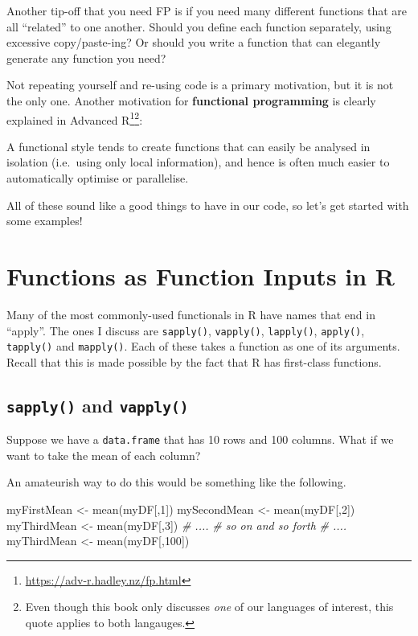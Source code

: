\documentclass[
  12pt,
]{krantz}
\makeatletter
\newenvironment{Shaded}{\begin{snugshade}}{\end{snugshade}}
\newcommand{\CommentTok}[1]{\textcolor[rgb]{0.37,0.37,0.37}{\textit{#1}}}
\newcommand{\DecValTok}[1]{\textcolor[rgb]{0.06,0.06,0.06}{#1}}
\newcommand{\FunctionTok}[1]{\textcolor[rgb]{0,0,0}{#1}}
\newcommand{\NormalTok}[1]{#1}
\newcommand{\OtherTok}[1]{\textcolor[rgb]{0.37,0.37,0.37}{#1}}
\renewenvironment{quote}{\begin{VF}}{\end{VF}}
\renewcommand{\href}[2]{#2\footnote{\url{#1}}}
\newenvironment{kframe}{%
\medskip{}
\setlength{\fboxsep}{.8em}
 \def\at@end@of@kframe{}%
 \ifinner\ifhmode%
  \def\at@end@of@kframe{\end{minipage}}%
  \begin{minipage}{\columnwidth}%
 \fi\fi%
 \def\FrameCommand##1{\hskip\@totalleftmargin \hskip-\fboxsep
 \colorbox{shadecolor}{##1}\hskip-\fboxsep
     \hskip-\linewidth \hskip-\@totalleftmargin \hskip\columnwidth}%
 \MakeFramed {\advance\hsize-\width
   \@totalleftmargin\z@ \linewidth\hsize
   \@setminipage}}%
 {\par\unskip\endMakeFramed%
 \at@end@of@kframe}
\renewenvironment{Shaded}{\begin{kframe}}{\end{kframe}}
\makeatother
\begin{document}
Another tip-off that you need FP is if you need many different functions that are all ``related'' to one another. Should you define each function separately, using excessive copy/paste-ing? Or should you write a function that can elegantly generate any function you need?

Not repeating yourself and re-using code is a primary motivation, but it is not the only one. Another motivation for \textbf{functional programming} is clearly explained in \href{https://adv-r.hadley.nz/fp.html}{Advanced R}\footnote{Even though this book only discusses \emph{one} of our languages of interest, this quote applies to both langauges.}:

\begin{quote}
A functional style tends to create functions that can easily be analysed in isolation (i.e.~using only local information), and hence is often much easier to automatically optimise or parallelise.
\end{quote}

All of these sound like a good things to have in our code, so let's get started with some examples!

\hypertarget{functions-as-function-inputs-in-r}{%
\section{Functions as Function Inputs in R}\label{functions-as-function-inputs-in-r}}

Many of the most commonly-used functionals in R have names that end in ``apply''. The ones I discuss are \texttt{sapply()}, \texttt{vapply()}, \texttt{lapply()}, \texttt{apply()}, \texttt{tapply()} and \texttt{mapply()}. Each of these takes a function as one of its arguments. Recall that this is made possible by the fact that R has first-class functions.

\hypertarget{sapply-and-vapply}{%
\subsection{\texorpdfstring{\texttt{sapply()} and \texttt{vapply()}}{sapply() and vapply()}}\label{sapply-and-vapply}}

Suppose we have a \texttt{data.frame} that has 10 rows and 100 columns. What if we want to take the mean of each column?

An amateurish way to do this would be something like the following.

\begin{Shaded}
\begin{Highlighting}[]
\NormalTok{myFirstMean }\OtherTok{\textless{}{-}} \FunctionTok{mean}\NormalTok{(myDF[,}\DecValTok{1}\NormalTok{])}
\NormalTok{mySecondMean }\OtherTok{\textless{}{-}} \FunctionTok{mean}\NormalTok{(myDF[,}\DecValTok{2}\NormalTok{])}
\NormalTok{myThirdMean }\OtherTok{\textless{}{-}} \FunctionTok{mean}\NormalTok{(myDF[,}\DecValTok{3}\NormalTok{])}
\CommentTok{\# ....}
\CommentTok{\# so on and so forth}
\CommentTok{\# ....}
\NormalTok{myThirdMean }\OtherTok{\textless{}{-}} \FunctionTok{mean}\NormalTok{(myDF[,}\DecValTok{100}\NormalTok{])}
\end{Highlighting}
\end{Shaded}
\end{document}

